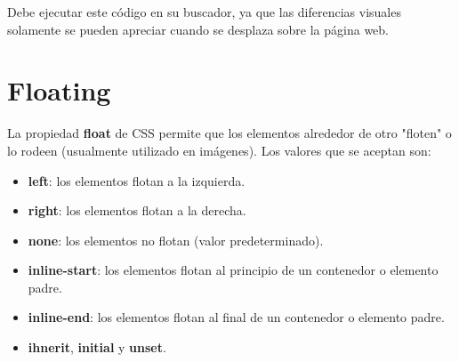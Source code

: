 Debe ejecutar este código en su buscador, ya que las diferencias visuales solamente se pueden apreciar cuando se desplaza sobre la página web.



\section{Floating}

La propiedad \textbf{float} de CSS permite que los elementos alrededor de otro "floten" o lo rodeen (usualmente utilizado en imágenes). Los valores que se aceptan son:
\begin{itemize}
    \item \textbf{left}: los elementos flotan a la izquierda.
    \item \textbf{right}: los elementos flotan a la derecha.
    \item \textbf{none}: los elementos no flotan (valor predeterminado).
    \item \textbf{inline-start}: los elementos flotan al principio de un contenedor o elemento padre.
    \item \textbf{inline-end}: los elementos flotan al final de un contenedor o elemento padre.
    \item \textbf{ihnerit}, \textbf{initial} y \textbf{unset}.
\end{itemize}

